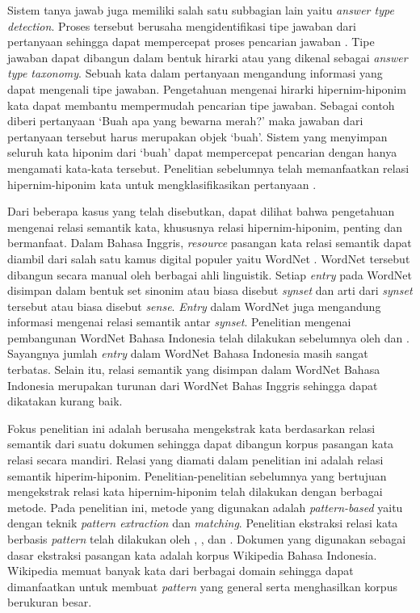 Sistem tanya jawab juga memiliki salah satu subbagian lain yaitu \textit{answer type detection}. Proses tersebut berusaha mengidentifikasi tipe jawaban dari pertanyaan sehingga dapat mempercepat proses pencarian jawaban \citep{jurafsky2000speech}. Tipe jawaban dapat dibangun dalam bentuk hirarki atau yang dikenal sebagai \textit{answer type taxonomy}. Sebuah kata dalam pertanyaan mengandung informasi yang dapat mengenali tipe jawaban. Pengetahuan mengenai hirarki hipernim-hiponim kata dapat membantu mempermudah pencarian tipe jawaban. Sebagai contoh diberi pertanyaan `Buah apa yang bewarna merah?' maka jawaban dari pertanyaan tersebut harus merupakan objek `buah'. Sistem yang menyimpan seluruh kata hiponim dari `buah' dapat mempercepat pencarian dengan hanya mengamati kata-kata tersebut. Penelitian sebelumnya telah memanfaatkan relasi hipernim-hiponim kata untuk mengklasifikasikan pertanyaan \citep{huang2008question}.

Dari beberapa kasus yang telah disebutkan, dapat dilihat bahwa pengetahuan mengenai relasi semantik kata, khususnya relasi hipernim-hiponim, penting dan bermanfaat. Dalam Bahasa Inggris, \textit{resource} pasangan kata relasi semantik dapat diambil dari salah satu kamus digital populer yaitu WordNet \citep{fellbaum1998wordnet}. WordNet tersebut dibangun secara manual oleh berbagai ahli linguistik. Setiap \textit{entry} pada WordNet disimpan dalam bentuk set sinonim atau biasa disebut \textit{synset} dan arti dari \textit{synset} tersebut atau biasa disebut \textit{sense}. \textit{Entry} dalam WordNet juga mengandung informasi mengenai relasi semantik antar \textit{synset}. Penelitian mengenai pembangunan WordNet Bahasa Indonesia telah dilakukan sebelumnya oleh  \cite{putra2008building} dan \citep{noor2011creating}. Sayangnya jumlah \textit{entry} dalam WordNet Bahasa Indonesia masih sangat terbatas. Selain itu, relasi semantik yang disimpan dalam WordNet Bahasa Indonesia merupakan turunan dari WordNet Bahas Inggris sehingga dapat dikatakan kurang baik.

Fokus penelitian ini adalah berusaha mengekstrak kata berdasarkan relasi semantik dari suatu dokumen sehingga dapat dibangun korpus pasangan kata relasi secara mandiri. Relasi yang diamati dalam penelitian ini adalah relasi semantik hiperim-hiponim. Penelitian-penelitian sebelumnya yang bertujuan mengekstrak relasi kata hipernim-hiponim telah dilakukan dengan berbagai metode. Pada penelitian ini, metode yang digunakan adalah \textit{pattern-based} yaitu dengan teknik \textit{pattern extraction} dan \textit{matching}. Penelitian ekstraksi relasi kata berbasis \textit{pattern} telah dilakukan oleh \cite{hearst1992automatic}, \cite{ruiz2005automatic}, dan \cite{arnold2014extracting}. Dokumen yang digunakan sebagai dasar ekstraksi pasangan kata adalah korpus Wikipedia Bahasa Indonesia. Wikipedia memuat banyak kata dari berbagai domain sehingga dapat dimanfaatkan untuk membuat \textit{pattern} yang general serta menghasilkan korpus berukuran besar.

